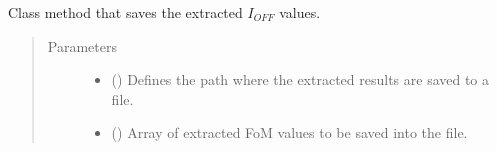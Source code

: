 \documentclass[letterpaper,10pt,english,openany, oneside]{sphinxmanual}
\begin{document}
\begin{fulllineitems}
\begin{fulllineitems}
\begin{quote}
\begin{description}
\end{description}\end{quote}

\end{fulllineitems}


\begin{fulllineitems}
\label{\detokenize{index:fompy.fom.ioff_ext.save_results_to_file}}
Class method that saves the extracted \(I_{OFF}\) values.
\begin{quote}\begin{description}
\item[{Parameters}] \leavevmode\begin{itemize}
\item {} 
 () \textendash{} Defines the path where the extracted results are saved to a file.

\item {} 
 () \textendash{} Array of extracted FoM values to be saved into the file.

\end{itemize}

\end{description}\end{quote}

\end{fulllineitems}


\end{fulllineitems}

\end{document}
